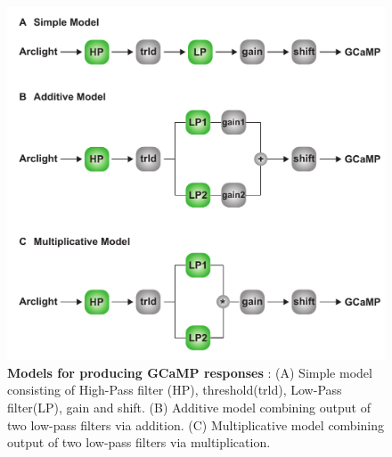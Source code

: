 \documentclass[9pt,lineno]{elife}
\begin{document}
\begin{figure}
\begin{fullwidth}
\includegraphics[width=0.84\linewidth]{figure4}
\caption{\textbf{Models for producing GCaMP responses} : (A) Simple model consisting of High-Pass filter (HP), threshold(trld), Low-Pass filter(LP), gain and shift. (B) Additive model combining output of two low-pass filters via addition. (C) Multiplicative model combining output of two low-pass filters via multiplication. }

\label{Modelillustration}
	
\end{fullwidth}
\end{figure} 
\end{document}
